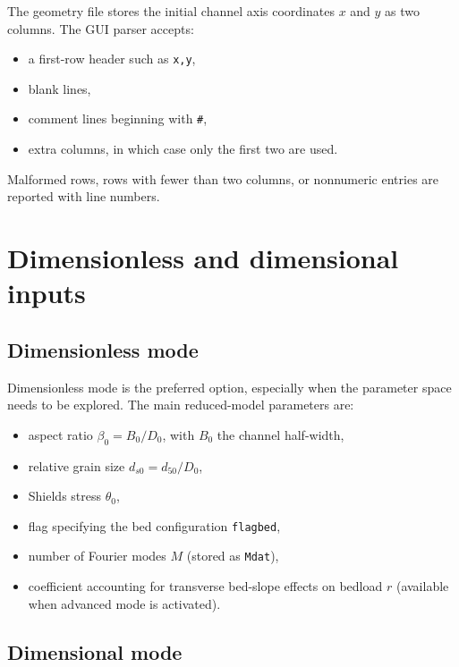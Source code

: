 \documentclass[11pt,a4paper]{article}
\begin{document}
The geometry file stores the initial channel axis coordinates $x$ and $y$ as two columns. The GUI parser accepts:

\begin{itemize}[leftmargin=1.2em]
	\item a first-row header such as \texttt{x,y},
	\item blank lines,
	\item comment lines beginning with \texttt{\#},
	\item extra columns, in which case only the first two are used.
\end{itemize}

Malformed rows, rows with fewer than two columns, or nonnumeric entries are reported with line numbers.

\section{Dimensionless and dimensional inputs}
\label{Dimensionless and dimensional inputs}

\subsection{Dimensionless mode}

Dimensionless mode is the preferred option, especially when the parameter space needs to be explored.  The main reduced-model parameters are:

\begin{itemize}[leftmargin=1.2em]
	\item aspect ratio $\beta_0 = B_0/D_0$, with $B_0$ the channel half-width,
	\item relative grain size $d_{s0} = d_{50}/D_0$,
	\item Shields stress $\theta_0$,
	\item flag specifying the bed configuration \texttt{flagbed},
	\item number of Fourier modes $M$ (stored as \texttt{Mdat}),
	\item  coefficient  accounting for transverse bed-slope effects on bedload $r$ (available when advanced mode is activated).
\end{itemize}

\subsection{Dimensional mode}
\end{document}

